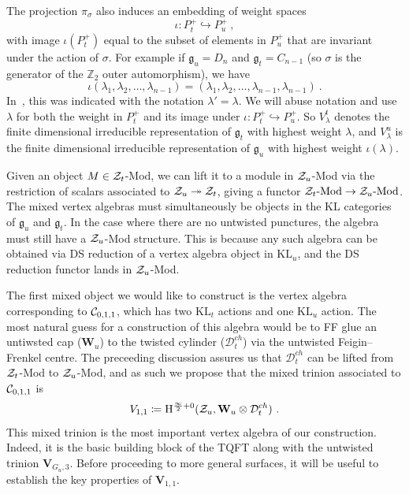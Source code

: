 \documentclass[a4paper]{article}
\def\IZ{\mathbb{Z}}
\def\CC{{\cal C}}
\def\ZZ{{\cal Z}}
\def\gf{\mathfrak{g}}
\def \KL{\mathrm{KL}}
\newcommand{\Hi}[1]{\mathrm{H}^{\frac{\infty}{2}+#1}}
\def\D{\mathcal{D}^{ch}}
\def\W{\mathbf{W}}
\def\V{\mathbf{V}}
\begin{document}
The projection $\pi_\sigma$ also induces an embedding of weight spaces
\begin{equation}
	\iota: P^+_t \hookrightarrow P^+_u~,
\end{equation}
with image $\iota(P_t^+)$ equal to the subset of elements in $P^+_u$ that are invariant under the action of $\sigma$. For example if $\gf_u=D_n$ and $\gf_t=C_{n-1}$ (so $\sigma$ is the generator of the $\IZ_2$ outer automorphism), we have
\begin{equation}
	\iota(\lambda_1,\lambda_2,\dots,\lambda_{n-1}) = (\lambda_1,\lambda_2,\dots,\lambda_{n-1},\lambda_{n-1})~.
\end{equation}
In~\cite{Lemos:2012ph}, this was indicated with the notation $\lambda'=\lambda$. We will abuse notation and use $\lambda$ for both the weight in $P_t^+$ and its image under $\iota:P_t^+\hookrightarrow P_u^+$. So $V_\lambda^t$ denotes the finite dimensional irreducible representation of $\gf_t$ with highest weight $\lambda$, and $V^u_{\lambda}$ is the finite dimensional irreducible representation of $\gf_u$ with highest weight $\iota(\lambda)$.

Given an object $M\in\ZZ_t$-Mod, we can lift it to a module in $\ZZ_u$-Mod via the restriction of scalars associated to $\ZZ_u\twoheadrightarrow \ZZ_t$, giving a functor $\ZZ_t\text{-Mod}\rightarrow\ZZ_u\text{-Mod}$. The mixed vertex algebras must simultaneously be objects in the $\KL$ categories of $\gf_u$ and $\gf_t$. In the case where there are no untwisted punctures, the algebra must still have a $\ZZ_u$-Mod structure. This is because any such algebra can be obtained via DS reduction of a vertex algebra object in $\KL_u$, and the DS reduction functor lands in $\ZZ_u$-Mod.

The first mixed object we would like to construct is the vertex algebra corresponding to $\CC_{0,1,1}$, which has two $\KL_t$ actions and one $\KL_u$ action. The most natural guess for a construction of this algebra would be to FF glue an untiwsted cap ($\W_u$) to the twisted cylinder ($\D_t$) via the untwisted Feigin--Frenkel centre. The preceeding discussion assures us that $\D_t$ can be lifted from $\ZZ_t$-Mod to $\ZZ_u$-Mod, and as such we propose that the mixed trinion associated to $\CC_{0,1,1}$ is
\begin{equation}
	V_{1,1}\coloneqq\Hi{0}(\ZZ_u,\W_u\otimes\D_t)~.
\end{equation}
This mixed trinion is the most important vertex algebra of our construction. Indeed, it is the basic building block of the TQFT along with the untwisted trinion $\V_{G_u,3}$. Before proceeding to more general surfaces, it will be useful to establish the key properties of $\V_{1,1}$.
\end{document}
